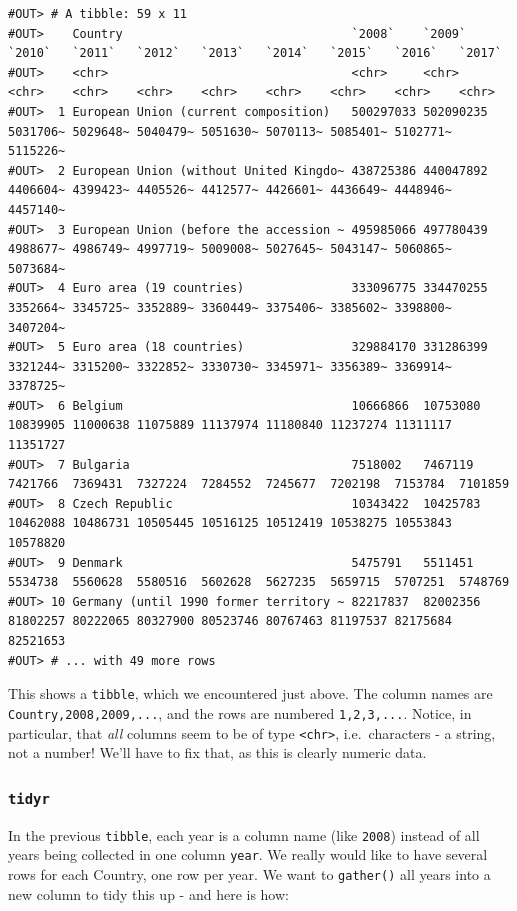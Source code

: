 \documentclass[]{book}
\begin{document}
\begin{verbatim}
#OUT> # A tibble: 59 x 11
#OUT>    Country                                `2008`    `2009`    `2010`   `2011`   `2012`   `2013`   `2014`   `2015`   `2016`   `2017`  
#OUT>    <chr>                                  <chr>     <chr>     <chr>    <chr>    <chr>    <chr>    <chr>    <chr>    <chr>    <chr>   
#OUT>  1 European Union (current composition)   500297033 502090235 5031706~ 5029648~ 5040479~ 5051630~ 5070113~ 5085401~ 5102771~ 5115226~
#OUT>  2 European Union (without United Kingdo~ 438725386 440047892 4406604~ 4399423~ 4405526~ 4412577~ 4426601~ 4436649~ 4448946~ 4457140~
#OUT>  3 European Union (before the accession ~ 495985066 497780439 4988677~ 4986749~ 4997719~ 5009008~ 5027645~ 5043147~ 5060865~ 5073684~
#OUT>  4 Euro area (19 countries)               333096775 334470255 3352664~ 3345725~ 3352889~ 3360449~ 3375406~ 3385602~ 3398800~ 3407204~
#OUT>  5 Euro area (18 countries)               329884170 331286399 3321244~ 3315200~ 3322852~ 3330730~ 3345971~ 3356389~ 3369914~ 3378725~
#OUT>  6 Belgium                                10666866  10753080  10839905 11000638 11075889 11137974 11180840 11237274 11311117 11351727
#OUT>  7 Bulgaria                               7518002   7467119   7421766  7369431  7327224  7284552  7245677  7202198  7153784  7101859 
#OUT>  8 Czech Republic                         10343422  10425783  10462088 10486731 10505445 10516125 10512419 10538275 10553843 10578820
#OUT>  9 Denmark                                5475791   5511451   5534738  5560628  5580516  5602628  5627235  5659715  5707251  5748769 
#OUT> 10 Germany (until 1990 former territory ~ 82217837  82002356  81802257 80222065 80327900 80523746 80767463 81197537 82175684 82521653
#OUT> # ... with 49 more rows
\end{verbatim}

This shows a \texttt{tibble}, which we encountered just above. The column names are \texttt{Country,2008,2009,...}, and the rows are numbered \texttt{1,2,3,...}. Notice, in particular, that \emph{all} columns seem to be of type \texttt{\textless{}chr\textgreater{}}, i.e.~characters - a string, not a number! We'll have to fix that, as this is clearly numeric data.

\hypertarget{tidyr}{%
\subsubsection{\texorpdfstring{\texttt{tidyr}}{tidyr}}\label{tidyr}}

In the previous \texttt{tibble}, each year is a column name (like \texttt{2008}) instead of all years being collected in one column \texttt{year}. We really would like to have several rows for each Country, one row per year. We want to \texttt{gather()} all years into a new column to tidy this up - and here is how:
\end{document}
